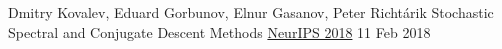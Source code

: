 \begin{cventries}
\cventry
{Dmitry Kovalev, Eduard Gorbunov, Elnur Gasanov, Peter Richtárik} %
{Stochastic Spectral and Conjugate Descent Methods} %
{\href{https://papers.nips.cc/paper/7596-stochastic-spectral-and-conjugate-descent-methods}{NeurIPS 2018}} 
{11 Feb 2018} %
{}	

	
%	
%
%
%	
%	

\end{cventries}

